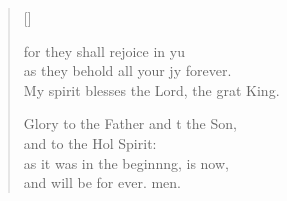 \begin{verse}[\versewidth]
\begin{patverse}
for they shall rejoice in yu\Flex\\
as they behold all your jy forever.\Med\\
My spirit blesses the Lord, the grat King.

Glory to the Father and t the Son,\Med\\
and to the Hol Spirit:\\
as it was in the beginn\pointup{\i}ng, is now,\Med\\
and will be for ever. men.

  \end{patverse}
\end{verse}
